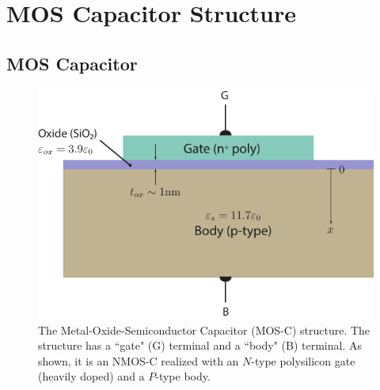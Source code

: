\section{MOS Capacitor Structure}
\subsection{MOS Capacitor}
\begin{figure}[tbh]
\centering
\includegraphics[width=.65\columnwidth]{mos_cap_structure}
\caption{The Metal-Oxide-Semiconductor Capacitor  (MOS-C) structure.  The structure has a ``gate" (G) terminal and a ``body" (B) terminal.  As shown, it is an NMOS-C realized with an $N$-type polysilicon gate (heavily doped) and a $P$-type body.}
\label{fig:mos_cap}
\end{figure}
